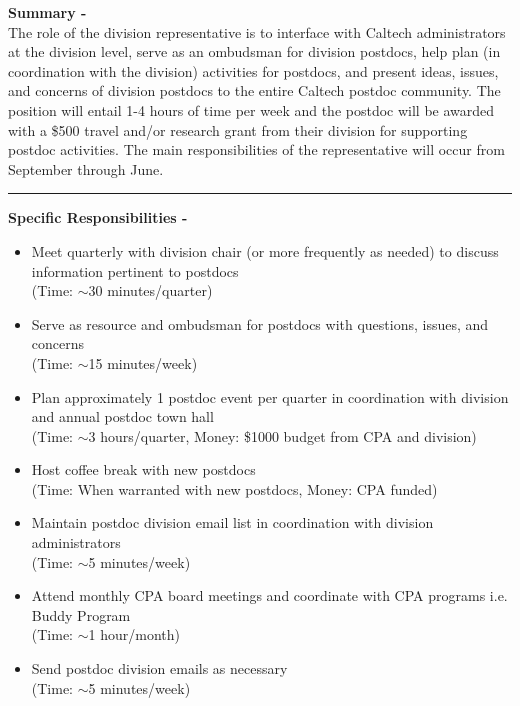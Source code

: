 \documentclass[12pt]{article}
\begin{document}
\pagestyle{fancy}
\rhead{{\thepage/\totalpages{}}}
\cfoot{}
\vspace*{-0.35in}

\textbf{Summary -}\\
The role of the division representative is to interface with Caltech administrators at the division level, serve as an ombudsman for division postdocs, help plan (in coordination with the division) activities for postdocs, and present ideas, issues, and concerns of division postdocs to the entire Caltech postdoc community.
The position will entail 1-4 hours of time per week and the postdoc will be awarded with a \$500 travel and/or research grant from their division for supporting postdoc activities.
The main responsibilities of the representative will occur from September through June.

\rule{\textwidth}{0.5pt}

\textbf{Specific Responsibilities -}
\begin{itemize}
 \item Meet quarterly with division chair (or more frequently as needed) to discuss information pertinent to postdocs\\ 
 (Time: $\sim$30 minutes/quarter)
 \item Serve as resource and ombudsman for postdocs with questions, issues, and concerns\\
 (Time: $\sim$15 minutes/week)
 \item Plan approximately 1 postdoc event per quarter in coordination with division and annual postdoc town hall\\
 (Time: $\sim$3 hours/quarter, Money: \$1000 budget from CPA and division)
 \item Host coffee break with new postdocs\\
 (Time: When warranted with new postdocs, Money: CPA funded)
 \item Maintain postdoc division email list in coordination with division administrators\\
 (Time: $\sim$5 minutes/week)
 \item Attend monthly CPA board meetings and coordinate with CPA programs i.e. Buddy Program\\
 (Time: $\sim$1 hour/month)
 \item Send postdoc division emails as necessary\\
 (Time: $\sim$5 minutes/week)
\end{itemize}
\end{document}
